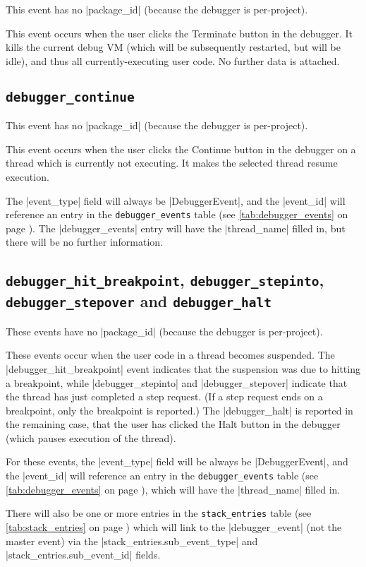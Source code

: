 \documentclass{book}
\newcommand{\myref}[1]{\autoref{#1} on page \pageref*{#1}}
\newcommand{\tabref}[1]{\lstinline|#1| table (see \myref{tab:#1})}
\begin{document}
This event has no |package_id| (because the debugger is per-project).

This event occurs when the user clicks the Terminate button in the debugger.
It kills the current debug VM (which will be subsequently restarted, but will
be idle), and thus all currently-executing user code.  No
further data is attached.

\subsection{\lstinline|debugger_continue|}

This event has no |package_id| (because the debugger is per-project).

This event occurs when the user clicks the Continue button in the debugger on
a thread which is currently not executing.
It makes the selected thread resume execution.  

The |event_type| field will always be |DebuggerEvent|, and the |event_id| will
reference an entry in the \tabref{debugger_events}.  The |debugger_events|
entry will have the |thread_name| filled in, but there will be no further information.

\subsection{\lstinline|debugger_hit_breakpoint|, \lstinline|debugger_stepinto|, \lstinline|debugger_stepover| and \lstinline|debugger_halt|}

These events have no |package_id| (because the debugger is per-project).

These events occur when the user code in a thread becomes suspended.  The
|debugger_hit_breakpoint| event indicates that the suspension was due to
hitting a breakpoint, while |debugger_stepinto| and |debugger_stepover|
indicate that the thread has just completed a step request.  (If a step
request ends on a breakpoint, only the breakpoint is reported.)  The
|debugger_halt| is reported in the remaining case, that the user has
clicked the Halt button in the debugger (which pauses execution of the thread).

For these events, the |event_type| field will be always be |DebuggerEvent|,
and the |event_id| will reference an entry in the \tabref{debugger_events},
which will have the |thread_name| filled in.

There will also be one or more entries in the \tabref{stack_entries} which
will link to the |debugger_event| (not the master event) via the
|stack_entries.sub_event_type| and |stack_entries.sub_event_id| fields.
\end{document}
